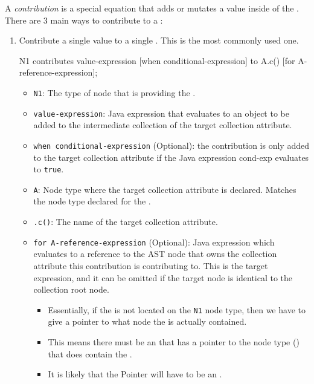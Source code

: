 \begin{definition}[Contribution]\label{def:Contribution}
  A \emph{contribution} is a special equation that adds or mutates a value inside of the .
  There are 3 main ways to contribute to a :
  \begin{enumerate}[noitemsep]
  \item Contribute a single value to a single . This is the most commonly used one.
\begin{javasource}
  N1 contributes value-expression
    [when conditional-expression]
    to A.c()
    [for A-reference-expression];
\end{javasource}
    \begin{itemize}[noitemsep]
    \item \texttt{N1}: The type of  node that is providing the .
    \item \texttt{value-expression}: Java expression that evaluates to an object to be added to the intermediate collection of the target collection attribute.
    \item \texttt{when conditional-expression} (Optional): the contribution is only added to the target collection attribute if the Java expression cond-exp evaluates to \texttt{true}.
    \item \texttt{A}: Node type where the target collection attribute is declared. Matches the node type declared for the .
    \item \texttt{.c()}: The name of the target collection attribute.
    \item \texttt{for A-reference-expression} (Optional): Java expression which evaluates to a reference to the AST node that owns the collection attribute this contribution is contributing to.
      This is the target expression, and it can be omitted if the target node is identical to the collection root node.
      \begin{itemize}[noitemsep]
      \item Essentially, if the  is not located on the \texttt{N1} node type, then we have to give a pointer to what node the  is actually contained.
      \item This means there must be an  that has a pointer to the node type () that does contain the .
      \item It is likely that the Pointer will have to be an .
      \end{itemize}
    \end{itemize}


\end{enumerate}
\end{definition}
